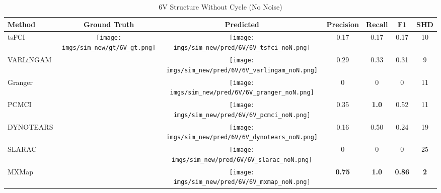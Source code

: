 \begin{table}[htb]
\begin{tabular}{l|c|c|c|c|c|c}
Method    & Ground Truth      & Predicted & Precision     & Recall       & F1            & SHD        \\ \hline
tsFCI     & \multirow{7}{*}[-16em]{\begin{minipage}{.17\linewidth} \centering \texttt{[image: imgs/sim\_new/gt/6V\_gt.png]} \end{minipage}} &  \begin{minipage}{.17\linewidth} \centering \texttt{[image: imgs/sim\_new/pred/6V/6V\_tsfci\_noN.png]} \end{minipage}  & 0.17          & 0.17         & 0.17          & 10         \\
VARLiNGAM &                   &  \begin{minipage}{.17\linewidth} \centering \texttt{[image: imgs/sim\_new/pred/6V/6V\_varlingam\_noN.png]} \end{minipage} & 0.29          & 0.33         & 0.31          & 9          \\
Granger   &                   &  \begin{minipage}{.17\linewidth} \centering \texttt{[image: imgs/sim\_new/pred/6V/6V\_granger\_noN.png]} \end{minipage} & 0             & 0            & 0             & 11         \\
PCMCI     &                   &  \begin{minipage}{.17\linewidth} \centering \texttt{[image: imgs/sim\_new/pred/6V/6V\_pcmci\_noN.png]} \end{minipage} & 0.35          & \textbf{1.0} & 0.52          & 11         \\
DYNOTEARS &                   &  \begin{minipage}{.17\linewidth} \centering \texttt{[image: imgs/sim\_new/pred/6V/6V\_dynotears\_noN.png]} \end{minipage}  & 0.16          & 0.50         & 0.24          & 19         \\
SLARAC    &                   & \begin{minipage}{.17\linewidth} \centering \texttt{[image: imgs/sim\_new/pred/6V/6V\_slarac\_noN.png]} \end{minipage}   & 0             & 0            & 0             & 25         \\ \cline{1-1} \cline{3-7} 
MXMap     &                   &  \begin{minipage}{.17\linewidth} \centering \texttt{[image: imgs/sim\_new/pred/6V/6V\_mxmap\_noN.png]} \end{minipage} & \textbf{0.75} & \textbf{1.0} & \textbf{0.86} & \textbf{2}
\end{tabular}
\caption{6V Structure Without Cycle (No Noise)}
\label{tab:6V_noN}
\end{table}

